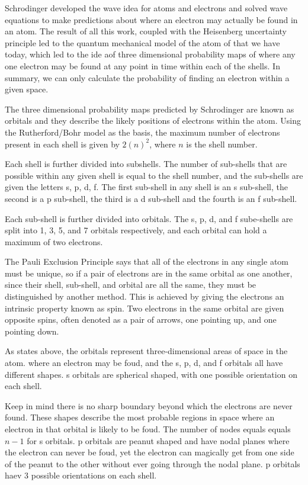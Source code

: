 \documentclass[../chem.tex]{subfiles}
\begin{document}
Schrodinger developed the wave idea for atoms and electrons and solved wave equations to make predictions about where an electron may actually be found in an atom.
The result of all this work, coupled with the Heisenberg uncertainty principle led to the quantum mechanical model of the atom of that we have today, which led to the ide aof three 
dimensional probability maps of where any one electron may be found at any point in time within each of the shells. In summary, we can only calculate the probability 
of finding an electron within a given space.

The three dimensional probability maps predicted by Schrodinger are known as orbitals and they describe the likely positions of electrons within the atom.
Using the Rutherford/Bohr model as the basis, the maximum number of electrons present in each shell is given by $2(n)^2$, where $n$ is the shell number.

Each shell is further divided into subshells. The number of sub-shells that are possible within any given shell is equal to the shell number, and the sub-shells are given the letters s, p, d, f.
The first sub-shell in any shell is an s sub-shell, the second is a p sub-shell, the third is a d sub-shell and the fourth is an f sub-shell.

Each sub-shell is further divided into orbitals. The s, p, d, and f sube-shells are split into 1, 3, 5, and 7 orbitals respectively, and each orbital can hold a maximum of two electrons. 

The Pauli Exclusion Principle says that all of the electrons in any single atom must be unique, so if a pair of electrons are in the same orbital as one another, since their shell, sub-shell, and orbital 
are all the same, they must be distinguished by another method. This is achieved by giving the electrons an intrinsic property known as spin. Two electrons 
in the same orbital are given opposite spins, often denoted as a pair of arrows, one pointing up, and one pointing down.

As states above, the orbitals represent three-dimensional areas of space in the atom. where an electron may be foud, and the s, p, d, and f orbitals all have different shapes. s orbitals are spherical shaped, with one possible orientation on each shell.

Keep in mind there is no sharp boundary beyond which the electrons are never found. These shapes describe the most probable regions in space where an electron in that orbital is likely to be foud.
The number of nodes equals equals $n-1$ for s orbitals. p orbitals are peanut shaped and have nodal planes where the electron can never be foud, yet the electron
can magically get from one side of the peanut to the other without ever going through the nodal plane. p orbitals haev 3 possible orientations on each shell.
\end{document}
